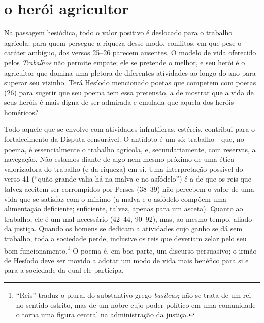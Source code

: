 \section{o herói agricultor}

Na passagem hesiódica, todo o valor positivo é deslocado para o trabalho
agrícola; para quem persegue a riqueza desse modo, conflitos, em que pese o caráter 
ambíguo, dos versos 25--26 parecem ausentes. O modelo de vida oferecido pelos 
\textit{Trabalhos} não permite empate; ele se pretende o melhor, e seu herói é 
o agricultor que domina uma pletora de diferentes atividades ao longo do ano para 
superar seu vizinho. Terá Hesíodo mencionado poetas que competem com poetas (26) 
para sugerir que seu poema tem essa pretensão, a de mostrar que a vida de seus heróis é
mais digna de ser admirada e emulada que aquela dos heróis homéricos?

Todo aquele que se envolve com atividades infrutíferas, estéreis,
contribui para o fortalecimento da Disputa censurável. O antídoto é um
só: trabalho - que, no poema, é essencialmente o trabalho agrícola, e,
secundariamente, com reservas, a navegação. Não estamos diante de algo
nem mesmo próximo de uma ética valorizadora do trabalho (e da riqueza)
em si. Uma interpretação possível do verso 41 (“quão grande valia há na
malva e no asfódelo”) é a de que os reis que talvez aceitem ser corrompidos
por Perses (38--39) não percebem o valor de uma vida que se satisfaz com
o mínimo (a malva e o asfódelo compõem uma alimentação deficiente; suficiente, 
talvez, apenas para um asceta). Quanto ao trabalho, ele é um mal necessário 
(42--44, 90--92), mas, ao mesmo tempo, aliado da justiça. Quando os homens se 
dedicam a atividades cujo ganho se dá sem trabalho, toda a sociedade perde, 
inclusive os reis que deveriam zelar pelo seu bom funcionamento.\footnote{ “Reis” 
traduz o plural do substantivo grego \textit{basileus}; não se trata de um rei
no sentido estrito, mas de um nobre cujo poder político em uma
comunidade o torna uma figura central na administração da justiça.} O
poema é, em boa parte, um discurso persuasivo; o irmão de Hesíodo deve
ser movido a adotar um modo de vida mais benéfico para si e para a
sociedade da qual ele participa.


